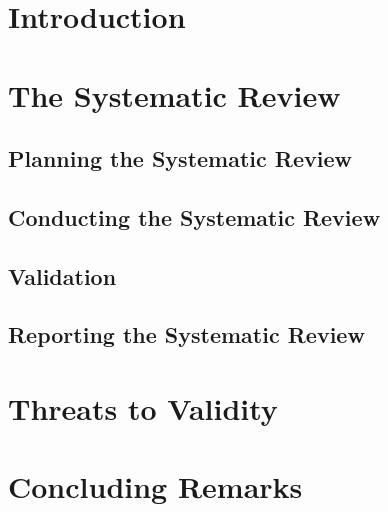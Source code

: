 \documentclass{sig-alternate}
\begin{document}


\section{Introduction}
	

%	
%		
	

\section{The Systematic Review}\label{method}
	
	\subsection{Planning the Systematic Review\label{planning}}
		
	\subsection{Conducting the Systematic Review\label{conducting}}
		
	\subsection{Validation\label{validation}}
			
	\subsection{Reporting the Systematic Review\label{reporting}}
		
	
\section{Threats to Validity}\label{threats}
		
		
%	
			
\section{Concluding Remarks}\label{conclusion}
		

%	      
	
		

\end{document}
